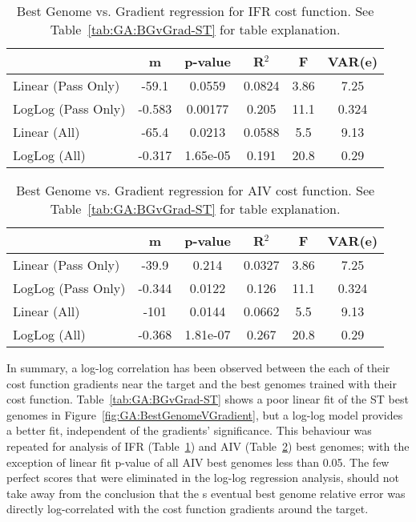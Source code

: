 \begin{table}[th]
  \centering
  \begin{tabular}{lccccc}
                   &   m    & p-value  & R$^2$  &   F  & VAR(e) \\[1ex] \hline
Linear (Pass Only) & -59.1  &  0.0559  & 0.0824 & 3.86 & 7.25    \\
LogLog (Pass Only) & -0.583 & 0.00177  & 0.205  & 11.1 & 0.324  \\[0.5ex] \hline
   Linear (All)    & -65.4  &  0.0213  & 0.0588 & 5.5  & 9.13     \\
   LogLog (All)    & -0.317 & 1.65e-05 & 0.191  & 20.8 & 0.29   \\[1ex] \hline    
\end{tabular}
  \caption{Best Genome vs. Gradient regression for IFR cost function. See Table~\ref{tab:GA:BGvGrad-ST} for table explanation.}
  \label{tab:GA:BGvGrad-IFR}
\end{table}


\begin{table}[th]
  \centering
  \begin{tabular}{lccccc}
                   &   m    & p-value  & R$^2$  &  F   & VAR(e)\\[1ex] \hline
Linear (Pass Only) & -39.9  &  0.214   & 0.0327 & 3.86 & 7.25 \\
LogLog (Pass Only) & -0.344 &  0.0122  & 0.126  & 11.1 & 0.324\\[0.5ex] \hline
   Linear (All)    &  -101  &  0.0144  & 0.0662 & 5.5  & 9.13 \\
   LogLog (All)    & -0.368 & 1.81e-07 & 0.267  & 20.8 & 0.29 \\[1ex] \hline    
\end{tabular}
  \caption{Best Genome vs. Gradient regression for AIV cost function.  See Table~\ref{tab:GA:BGvGrad-ST} for table explanation.}
  \label{tab:GA:BGvGrad-AIV}
\end{table}



In summary, a log-log correlation has been observed between the each
of their cost function gradients near the target and the best genomes
trained with their cost function. Table~\ref{tab:GA:BGvGrad-ST} shows
a poor linear fit of the ST best genomes in
Figure~\ref{fig:GA:BestGenomeVGradient}, but a log-log model provides
a better fit, independent of the gradients' significance. This
behaviour was repeated for analysis of IFR
(Table~\ref{tab:GA:BGvGrad-IFR}) and AIV
(Table~\ref{tab:GA:BGvGrad-AIV}) best genomes; with the exception of
linear fit p-value of all AIV best genomes less than 0.05.  The few
perfect scores that were eliminated in the log-log regression
analysis, should not take away from the conclusion that the {\GA}s
eventual best genome relative error was directly log-correlated with
the cost function gradients around the target.




